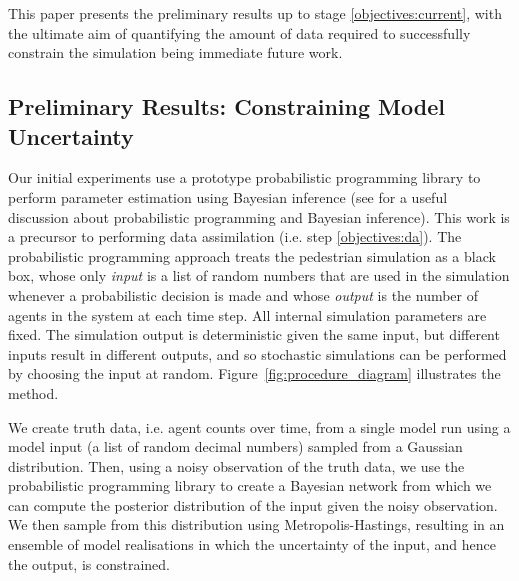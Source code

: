 \documentclass[runningheads]{llncs}
\begin{document}
This paper presents the preliminary results up to stage \ref{objectives:current}, with the ultimate aim of quantifying the amount of data required to successfully constrain the simulation being immediate future work. 


\subsection{Preliminary Results: Constraining Model Uncertainty}

Our initial experiments use a prototype probabilistic programming library to perform parameter estimation using Bayesian inference (see \cite{ghahramani_probabilistic_2015} for a useful discussion about probabilistic programming and Bayesian inference). This work is a precursor to performing data assimilation (i.e. step \ref{objectives:da}). The probabilistic programming approach treats the pedestrian simulation as a black box, whose only \emph{input} is a list of random numbers that are used in the simulation whenever a probabilistic decision is made and whose \emph{output} is the number of agents in the system at each time step. All internal simulation parameters are fixed. The simulation output is deterministic given the same input, but different inputs result in different outputs, and so stochastic simulations can be performed by choosing the input at random. Figure~\ref{fig:procedure_diagram} illustrates the method. 

We create truth data, i.e. agent counts over time, from a single model run using a model input (a list of random decimal numbers) sampled from a Gaussian distribution. Then, using a noisy observation of the truth data, we use the probabilistic programming library to create a Bayesian network from which we can compute the posterior distribution of the input given the noisy observation. We then sample from this distribution using Metropolis-Hastings, resulting in an ensemble of model realisations in which the uncertainty of the input, and hence the output, is constrained.

\end{document}
